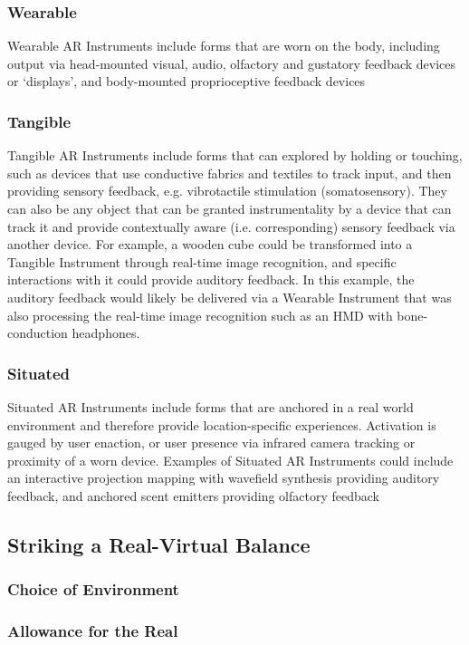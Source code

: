\subsubsection{Wearable}
Wearable AR Instruments include forms that are worn on the body, including output via head-mounted visual, audio, olfactory and gustatory feedback devices or `displays', and body-mounted proprioceptive feedback devices

\subsubsection{Tangible}
Tangible AR Instruments include forms that can explored by holding or touching, such as devices that use conductive fabrics and textiles to track input, and then providing sensory feedback, e.g. vibrotactile stimulation (somatosensory). They can also be any object that can be granted instrumentality by a device that can track it and provide contextually aware (i.e. corresponding) sensory feedback via another device. For example, a wooden cube could be transformed into a Tangible Instrument through real-time image recognition, and specific interactions with it could provide auditory feedback. In this example, the auditory feedback would likely be delivered via a Wearable Instrument that was also processing the real-time image recognition such as an HMD with bone-conduction headphones.

\subsubsection{Situated}
Situated AR Instruments include forms that are anchored in a real world environment and therefore provide location-specific experiences. Activation is gauged by user enaction, or user presence via infrared camera tracking or proximity of a worn device. Examples of Situated AR Instruments could include an interactive projection mapping with wavefield synthesis providing auditory feedback, and anchored scent emitters providing olfactory feedback

\subsection{Striking a Real-Virtual Balance} \label{sec: discussion-patterns-environment}
\subsubsection{Choice of Environment}
\subsubsection{Allowance for the Real}




